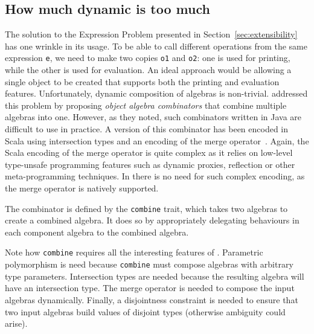 \subsection{How much dynamic is too much}
\label{sec:dynamic}



The solution to the Expression Problem presented in
Section~\ref{sec:extensibility} has one wrinkle in its usage. To be able to call
different operations from the same expression \lstinline{e}, we need to make two
copies \lstinline{o1} and \lstinline{o2}: one is used for printing, while the
other is used for evaluation. An ideal approach would be allowing a single object
to be created that supports both the printing and evaluation features.
Unfortunately, dynamic composition of algebras is non-trivial.
\citet{oliveira2012extensibility} addressed this problem by proposing
\textit{object algebra combinators} that combine multiple algebras into one.
However, as they noted, such combinators written in Java are difficult to use in
practice. A version of this combinator has been encoded in Scala using
intersection types and an encoding of the merge
operator~\cite{oliveira2013feature, rendel14attributes}. Again, the Scala
encoding of the merge operator is quite complex as it relies on low-level
type-unsafe programming features such as dynamic proxies, reflection or other
meta-programming techniques. In \name there is no need for such complex
encoding, as the merge operator is natively supported.

The combinator is defined by the \lstinline{combine} trait, which takes two
algebras to create a combined algebra. It does so by appropriately delegating
behaviours in each component algebra to the combined algebra.


Note how \lstinline{combine} requires all the interesting features of \name.
Parametric polymorphism is need because \lstinline{combine} must compose algebras
with arbitrary type parameters. Intersection types are needed because the
resulting algebra will have an intersection type. The merge operator is needed
to compose the input algebras dynamically. Finally, a disjointness constraint is
needed to ensure that two input algebras build values of disjoint types
(otherwise ambiguity could arise).

